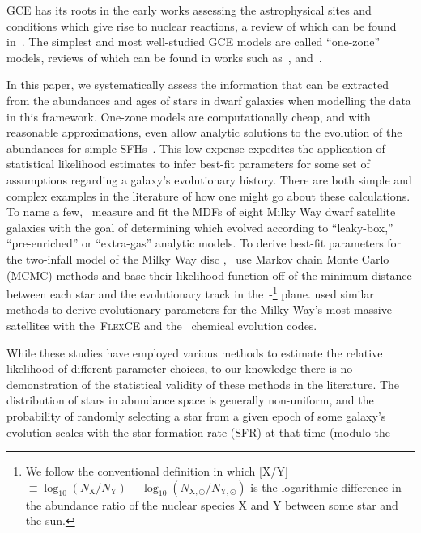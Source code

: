 \documentclass[ms.tex]{subfiles}
\begin{document}
GCE has its roots in the early works assessing the astrophysical sites and
conditions which give rise to nuclear reactions, a review of which can be
found in~\citep[][the famous ``B2FH'' paper]{Burbidge1957}.
The simplest and most well-studied GCE models are called ``one-zone'' models,
reviews of which can be found in works such as~\citet{Tinsley1980},
\citet{Pagel2009} and~\citet{Matteucci2012, Matteucci2021}.
\par
In this paper, we systematically assess the information that can be extracted
from the abundances and ages of stars in dwarf galaxies when modelling the
data in this framework.
One-zone models are computationally cheap, and with reasonable approximations,
even allow analytic solutions to the evolution of the abundances for simple
SFHs~\citep*[e.g.][]{Weinberg2017}.
This low expense expedites the application of statistical likelihood estimates
to infer best-fit parameters for some set of assumptions regarding a galaxy's
evolutionary history.
There are both simple and complex examples in the literature of how one might
go about these calculations.
To name a few,~\citet{Kirby2011} measure and fit the MDFs of eight Milky Way
dwarf satellite galaxies with the goal of determining which evolved according
to ``leaky-box,'' ``pre-enriched'' or ``extra-gas'' analytic models.
To derive best-fit parameters for the two-infall model of the Milky Way disc
\citep[e.g.][]{Chiappini1997},~\citet{Spitoni2020, Spitoni2021} use Markov
chain Monte Carlo (MCMC) methods and base their likelihood function off of the
minimum distance between each star and the evolutionary track in
the~\afe-\feh\footnote{
	We follow the conventional definition in which
	[X/Y]~$\equiv \log_{10}(N_\text{X} / N_\text{Y}) -
	\log_{10}(N_{\text{X},\odot} / N_{\text{Y},\odot})$
	is the logarithmic difference in the abundance ratio of the nuclear species
	X and Y between some star and the sun.
} plane.
\citet{Hasselquist2021} used similar methods to derive evolutionary parameters
for the Milky Way's most massive satellites with the~\textsc{FlexCE}
\citep{Andrews2017} and the~\citet{Lian2018, Lian2020} chemical evolution
codes.
\par
While these studies have employed various methods to estimate the relative
likelihood of different parameter choices, to our knowledge there is no
demonstration of the statistical validity of these methods in the literature.
The distribution of stars in abundance space is generally non-uniform, and the
probability of randomly selecting a star from a given epoch of some galaxy's
evolution scales with the star formation rate (SFR) at that time (modulo the
\end{document}
